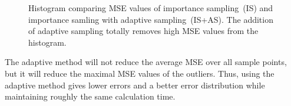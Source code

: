 \begin{figure}[H]
  \centerline{
    }
  \caption{Histogram comparing MSE values of importance sampling~(IS)
    and importance samling with adaptive sampling~(IS+AS).  The
    addition of adaptive sampling totally removes high MSE values from
    the histogram.}
  \label{plot:adaptive}
\end{figure}
The adaptive method will not reduce the average MSE over all sample
points, but it will reduce the maximal MSE values of the
outliers. Thus, using the adaptive method gives lower errors and a
better error distribution while maintaining roughly the same
calculation time.


